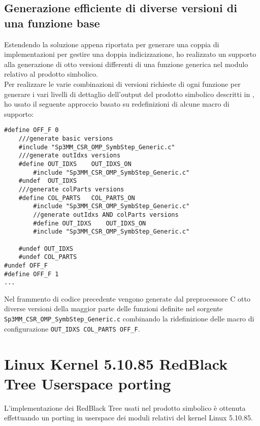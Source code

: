 \subsection[Generazione multiple versioni di funzioni]
{Generazione efficiente di diverse versioni di una funzione base}	\label{chSpMMAux:multiImplMany}
Estendendo la soluzione appena riportata per generare una coppia di implementazioni per gestire una doppia indicizzazione,
ho realizzato un supporto alla generazione di otto versioni differenti di una funzione generica nel modulo relativo al prodotto simbolico.\\
Per realizzare le varie combinazioni di versioni richieste di ogni funzione per generare i vari livelli di dettaglio dell'output 
del prodotto simbolico descritti in ,
ho usato il seguente approccio basato su redefinizioni di alcune macro di supporto:\\
\begin{lstlisting}
#define OFF_F 0
	///generate basic versions
	#include "Sp3MM_CSR_OMP_SymbStep_Generic.c"
	///generate outIdxs versions
	#define OUT_IDXS 	OUT_IDXS_ON	
		#include "Sp3MM_CSR_OMP_SymbStep_Generic.c"
	#undef  OUT_IDXS
	///generate colParts versions
	#define COL_PARTS	COL_PARTS_ON
		#include "Sp3MM_CSR_OMP_SymbStep_Generic.c"
		//generate outIdxs AND colParts versions
		#define OUT_IDXS 	OUT_IDXS_ON
		#include "Sp3MM_CSR_OMP_SymbStep_Generic.c"

	#undef OUT_IDXS
	#undef COL_PARTS
#undef OFF_F
#define OFF_F 1
...
\end{lstlisting}
Nel frammento di codice precedente vengono generate dal preprocessore C otto diverse versioni
della maggior parte delle funzioni definite nel sorgente \\ \verb|Sp3MM_CSR_OMP_SymbStep_Generic.c|
combinando la ridefinizione delle macro di configurazione \verb|OUT_IDXS COL_PARTS OFF_F|.\\

\section{Linux Kernel 5.10.85 RedBlack Tree Userspace porting} \label{chSpMMAux:linuxRBTree}
L'implementazione dei RedBlack Tree usati nel prodotto simbolico è ottenuta effettuando un porting in 
userspace dei moduli relativi del kernel Linux 5.10.85.\\
